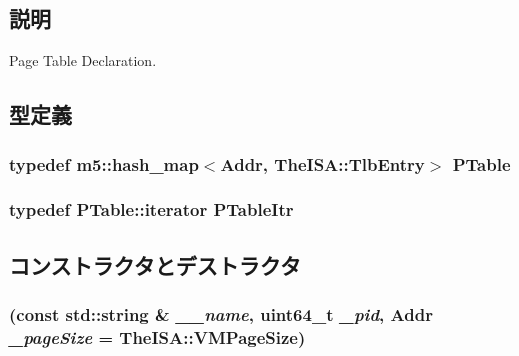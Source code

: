 \subsection{説明}
Page Table Declaration. 

\subsection{型定義}
\hypertarget{classPageTable_af3d8a3d9e644cad85356d24d9c324628}{
\subsubsection[{PTable}]{\setlength{\rightskip}{0pt plus 5cm}typedef m5::hash\_\-map$<${\bf Addr}, TheISA::TlbEntry$>$ {\bf PTable}}}
\label{classPageTable_af3d8a3d9e644cad85356d24d9c324628}
\hypertarget{classPageTable_ae7a302b2a02308ebbb6a164d74a9b2fa}{
\subsubsection[{PTableItr}]{\setlength{\rightskip}{0pt plus 5cm}typedef PTable::iterator {\bf PTableItr}}}
\label{classPageTable_ae7a302b2a02308ebbb6a164d74a9b2fa}


\subsection{コンストラクタとデストラクタ}
\hypertarget{classPageTable_a0ba607685599040207fa0f5834252a97}{
\subsubsection[{PageTable}]{ (const std::string \& {\em \_\-\_\-name}, \/  uint64\_\-t {\em \_\-pid}, \/  {\bf Addr} {\em \_\-pageSize} = {\ttfamily TheISA::VMPageSize})}}
\label{classPageTable_a0ba607685599040207fa0f5834252a97}




